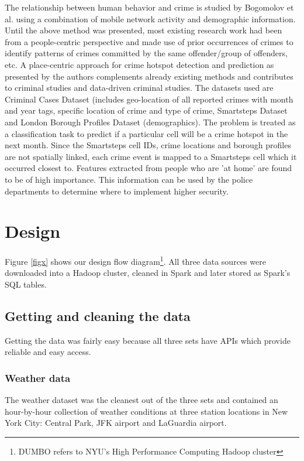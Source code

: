 \documentclass{sigkddExp}
\begin{document}
The relationship between human behavior and crime is studied by Bogomolov et al. \cite{OUAC} using a combination of mobile network activity and demographic information. Until the above method was presented, most existing research work had been from a people-centric perspective and made use of prior occurrences of crimes to identify patterns of crimes committed by the same offender/group of offenders, etc. A place-centric approach for crime hotspot detection and prediction as presented by the authors complements already existing methods and contributes to criminal studies and data-driven criminal studies. 
The datasets used are Criminal Cases Dataset (includes geo-location of all reported crimes with month and year tags, specific location of crime and type of crime, Smartsteps Dataset and London Borough Profiles Dataset (demographics). The problem is treated as a classification task to predict if a particular cell will be a crime hotspot in the next month. Since the Smartsteps cell IDs, crime locations and borough profiles are not spatially linked, each crime event is mapped to a Smartsteps cell which it occurred closest to.  
Features extracted from people who are 'at home' are found to be of high importance. This information can be used by the police departments to determine where to implement higher security.

\section{Design}

Figure \ref{figx} shows our design flow diagram\footnote{DUMBO refers to NYU's High Performance Computing Hadoop cluster}. All three data sources were downloaded into a Hadoop cluster, cleaned in Spark and later stored as Spark's SQL tables. 

\subsection{Getting and cleaning the data}

Getting the data was fairly easy because all three sets have APIs which provide reliable and easy access.

\subsubsection{Weather data} 
The weather dataset was the cleanest out of the three sets and contained an hour-by-hour collection of weather conditions at three station locations in New York City: Central Park, JFK airport and LaGuardia airport. 
\end{document}
